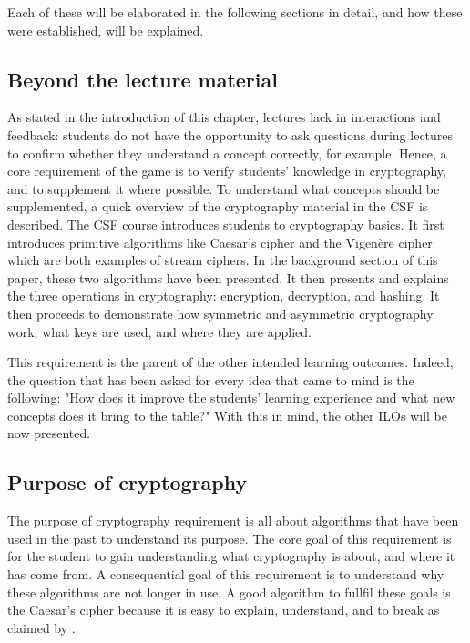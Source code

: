 \documentclass{l4proj}
\begin{document}
Each of these will be elaborated in the following sections in detail, 
and how these were established, will be explained.

\subsection{Beyond the lecture material}

As stated in the introduction of this chapter, lectures lack in interactions and feedback:
students do not have the opportunity to ask questions during lectures to confirm whether they understand a concept correctly, for example.
Hence, a core requirement of the game is to verify students' knowledge in cryptography, 
and to supplement it where possible. To understand what concepts should be supplemented, 
a quick overview of the cryptography material in the CSF is described.
The CSF course introduces students to cryptography basics.
It first introduces primitive algorithms like Caesar's cipher and the Vigenère cipher which are both
examples of stream ciphers. 
In the background section of this paper, these two algorithms have been presented.
It then presents and explains the three operations in cryptography: encryption, decryption, and hashing.
It then proceeds to demonstrate how symmetric and asymmetric cryptography work, what keys are used, and where they are applied.

This requirement is the parent of the other intended learning outcomes. 
Indeed, the question that has been asked for every idea that came to mind is the following:
"How does it improve the students' learning experience and what new concepts does it bring to the table?"
With this in mind, the other ILOs will be now presented.

\subsection{Purpose of cryptography}

The purpose of cryptography requirement is all about algorithms that have been used in the past to understand its purpose.
The core goal of this requirement is for the student to gain understanding what cryptography is about, and where it has come from.
A consequential goal of this requirement is to understand why these algorithms are not longer in use.
A good algorithm to fullfil these goals is the Caesar's cipher because it is easy to explain, 
understand, and to break as claimed by \citet{anderson_security_2008}.
\end{document}
